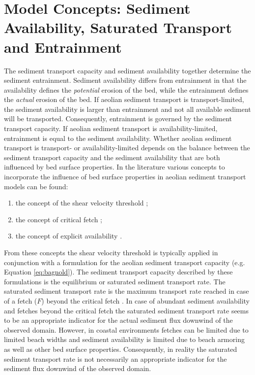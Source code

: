\section{Model Concepts: Sediment Availability, Saturated Transport
  and Entrainment}
\label{sec:model_concepts}

The sediment transport capacity and sediment availability together
determine the sediment entrainment. Sediment availability differs from
entrainment in that the availability defines the \emph{potential}
erosion of the bed, while the entrainment defines the \emph{actual}
erosion of the bed. If aeolian sediment transport is
transport-limited, the sediment availability is larger than
entrainment and not all available sediment will be
transported. Consequently, entrainment is governed by the sediment
transport capacity. If aeolian sediment transport is
availability-limited, entrainment is equal to the sediment
availability. Whether aeolian sediment transport is transport- or
availability-limited depends on the balance between the sediment
transport capacity and the sediment availability that are both
influenced by bed surface properties. In the literature various
concepts to incorporate the influence of bed surface properties in
aeolian sediment transport models can be found:

\begin{enumerate}
\item the concept of the shear velocity threshold
  \citep[e.g.][]{Howard1977, Dyer1986, Belly1964, Johnson1965,
    Hotta1984, Nickling1981, Arens1996};
\item the concept of critical fetch \citep[e.g.][]{Bauer2002,
    DelgadoFernandez2010};
\item the concept of explicit availability \citep[or
  supply;][]{deVries2014a}.
\end{enumerate}

From these concepts the shear velocity threshold is typically applied
in conjunction with a formulation for the aeolian sediment transport
capacity (e.g. Equation \ref{eq:bagnold}). The sediment transport
capacity described by these formulations is the equilibrium or
saturated sediment transport rate. The saturated sediment transport
rate is the maximum transport rate reached in case of a fetch ($F$)
beyond the critical fetch \citep[$F_{\mathrm{c}}$, ][]{Bauer2002}. In
case of abundant sediment availability and fetches beyond the critical
fetch the saturated sediment transport rate seems to be an appropriate
indicator for the actual sediment flux downwind of the observed
domain. However, in coastal environments fetches can be limited due to
limited beach widths \citep[e.g.][]{Jackson1999, Bauer2009,
  DavidsonArnott2005, DelgadoFernandez2010, Dong2004a} and sediment
availability is limited due to beach armoring as well as other bed
surface properties. Consequently, in reality the saturated sediment
transport rate is not necessarily an appropriate indicator for the
sediment flux downwind of the observed domain.

